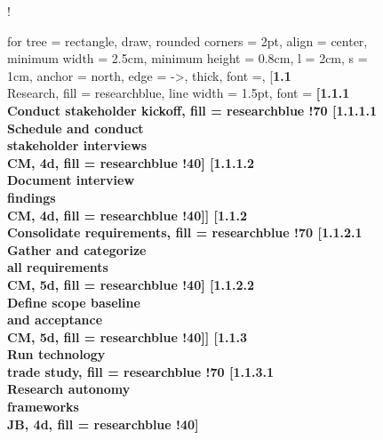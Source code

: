 \begin{figure}[H]
\centering
\resizebox{\textwidth} { ! }
{
\begin { forest }
  for
    tree =
        {
            rectangle,
            draw,
            rounded corners = 2pt,
            align = center,
            minimum width = 2.5cm,
            minimum height = 0.8cm,
            l = 2cm,
            s = 1cm,
            anchor = north,
            edge = {->, thick},
            font =\tiny,
        }[{\textbf{1.1}\\Research}, fill = researchblue, line width = 1.5pt,
          font =\bfseries
              [{\textbf{1.1.1}\\Conduct stakeholder kickoff},
               fill = researchblue !70
                   [{\textbf{1.1.1.1}\\Schedule and
                        conduct\\stakeholder interviews\\{\tiny CM, 4d}},
                    fill = researchblue !40]
                   [{\textbf{1.1.1.2}\\Document interview\\findings\\{\tiny CM,
                                                                      4d}},
                    fill = researchblue !40]]
              [{\textbf{1.1.2}\\Consolidate requirements},
               fill = researchblue !70
                   [{\textbf{1.1.2.1}\\Gather and
                        categorize\\all requirements\\{\tiny CM, 5d}},
                    fill = researchblue !40]
                   [{\textbf{1.1.2.2}\\Define scope baseline\\and
                        acceptance\\{\tiny CM, 5d}},
                    fill = researchblue !40]]
              [{\textbf{1.1.3}\\Run technology\\trade study},
               fill = researchblue !70 [{\textbf{1.1.3.1}\\Research
                                                autonomy\\frameworks\\{\tiny JB,
                                                                       4d}},
                                        fill = researchblue !40]

\end{ forest }}
\end{figure}
